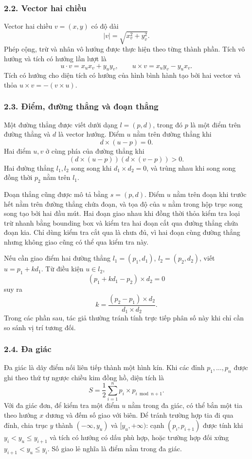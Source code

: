 \documentclass[11pt]{article}
\begin{document}
\subsubsection*{2.2. Vector hai chiều}

Vector hai chiều \(v=(x,y)\) có độ dài
\[
  |v|=\sqrt{x_v^2+y_v^2}.
\]
Phép cộng, trừ và nhân vô hướng được thực hiện theo từng thành phần. Tích vô
hướng và tích có hướng lần lượt là
\[
  u\cdot v=x_ux_v+y_uy_v,\qquad
  u\times v=x_uy_v-y_ux_v.
\]
Tích có hướng cho diện tích có hướng của hình bình hành tạo bởi hai vector và
thỏa \(u\times v=-(v\times u)\).

\subsubsection*{2.3. Điểm, đường thẳng và đoạn thẳng}

Một đường thẳng được viết dưới dạng \(l=(p,d)\), trong đó \(p\) là một điểm
trên đường thẳng và \(d\) là vector hướng. Điểm \(u\) nằm trên đường thẳng khi
\[
  d\times(u-p)=0.
\]
Hai điểm \(u,v\) ở cùng phía của đường thẳng khi
\[
  (d\times(u-p))(d\times(v-p))>0.
\]
Hai đường thẳng \(l_1,l_2\) song song khi \(d_1\times d_2=0\), và trùng nhau
khi song song đồng thời \(p_2\) nằm trên \(l_1\).

Đoạn thẳng cũng được mô tả bằng \(s=(p,d)\). Điểm \(u\) nằm trên đoạn khi trước
hết nằm trên đường thẳng chứa đoạn, và tọa độ của \(u\) nằm trong hộp trục song
song tạo bởi hai đầu mút. Hai đoạn giao nhau khi đồng thời thỏa kiểm tra loại
trừ nhanh bằng bounding box và kiểm tra hai đoạn cắt qua đường thẳng chứa đoạn
kia. Chỉ dùng kiểm tra cắt qua là chưa đủ, vì hai đoạn cùng đường thẳng nhưng
không giao cũng có thể qua kiểm tra này.

Nếu cần giao điểm hai đường thẳng \(l_1=(p_1,d_1)\), \(l_2=(p_2,d_2)\), viết
\(u=p_1+kd_1\). Từ điều kiện \(u\in l_2\),
\[
  (p_1+kd_1-p_2)\times d_2=0
\]
suy ra
\[
  k=\frac{(p_2-p_1)\times d_2}{d_1\times d_2}.
\]
Trong các phần sau, tác giả thường tránh tính trực tiếp phân số này khi chỉ
cần so sánh vị trí tương đối.

\subsubsection*{2.4. Đa giác}

Đa giác là dãy điểm nối liên tiếp thành một hình kín. Khi các đỉnh
\(p_1,\ldots,p_n\) được ghi theo thứ tự ngược chiều kim đồng hồ, diện tích là
\[
  S=\frac12\sum_{i=1}^{n} p_i\times p_{i\bmod n+1}.
\]
Với đa giác đơn, để kiểm tra một điểm \(u\) nằm trong đa giác, có thể bắn một
tia theo hướng \(x\) dương và đếm số giao với biên. Để tránh trường hợp tia đi
qua đỉnh, chia trục \(y\) thành \((-\infty,y_u)\) và \([y_u,+\infty)\): cạnh
\((p_i,p_{i+1})\) được tính khi \(y_i<y_u\le y_{i+1}\) và tích có hướng có dấu
phù hợp, hoặc trường hợp đối xứng \(y_{i+1}<y_u\le y_i\). Số giao lẻ nghĩa là
điểm nằm trong đa giác.
\end{document}
